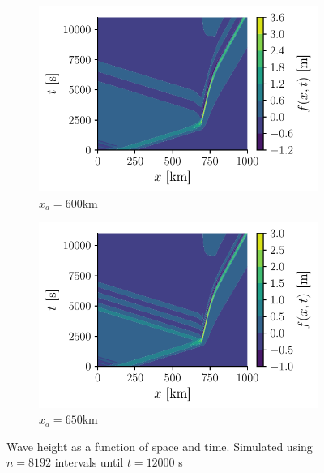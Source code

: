 \begin{figure}[h]
    \centering
    \begin{subfigure}{0.48\linewidth}
        \centering
        \includegraphics[width=\linewidth]{figures/corail_eq1_movement_xa=600000.pdf}
        \caption{\(x_a = 600\)km}
        \label{fig:corail_eq1_mouv_xa=60km}
    \end{subfigure}
    \begin{subfigure}{0.48\linewidth}
        \centering
        \includegraphics[width=\linewidth]{figures/corail_eq1_movement_xa=650000.pdf}
        \caption{\(x_a = 650\)km}
        \label{fig:corail_eq1_mouv_xa=65km}
    \end{subfigure}
    \caption{Wave height as a function of space and time. Simulated using \(n=8192\) intervals until \(t=12000\) \si{\second}}
    \label{fig:corail_eq1_mouv_xa}
\end{figure}

